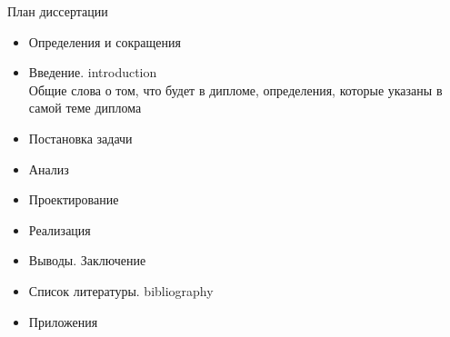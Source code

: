 \documentclass[11pt]{article}
\begin{document}
\Large{План диссертации}

\begin{itemize}
\item Определения и сокращения
\item Введение. introduction\\
Общие слова о том, что будет в дипломе, определения, которые указаны в самой теме диплома
\item Постановка задачи
\item Анализ
\item Проектирование
\item Реализация
\item Выводы. Заключение
\item Список литературы. bibliography
\item Приложения
\end{itemize}
\newpage
\end{document}

